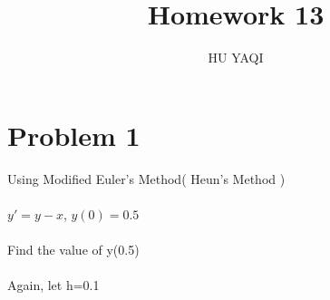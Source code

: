\documentclass{article}
\title{ Homework 13 }
\author{HU YAQI}
\begin{document}
\maketitle
\setlength{\parindent}{0pt}
\section{ Problem 1 }
Using Modified Euler's Method( Heun's Method )\\
\\
$y'=y-x$, $y(0)=0.5$\\
\\
Find the value of y(0.5)\\
\\
Again, let h=0.1
\end{document}
